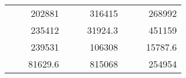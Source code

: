 \begin{table}[H]
\begin{tabular}{|ccrccrccc}
\rowcolor[HTML]{DAE8FC} 
\multicolumn{1}{|c|}{\cellcolor[HTML]{FFFFC7}}                                & \multicolumn{1}{c|}{\cellcolor[HTML]{DAE8FC}}                      & \multicolumn{1}{r|}{\cellcolor[HTML]{DAE8FC}202881}    & \multicolumn{1}{c|}{\cellcolor[HTML]{FFFFC7}}                                & \multicolumn{1}{c|}{\cellcolor[HTML]{DAE8FC}}                       & \multicolumn{1}{r|}{\cellcolor[HTML]{DAE8FC}316415}    & \multicolumn{1}{c|}{\cellcolor[HTML]{FFFFC7}}                                & \multicolumn{1}{c|}{\cellcolor[HTML]{DAE8FC}}                      & \multicolumn{1}{r|}{\cellcolor[HTML]{DAE8FC}268992}    \\ \cline{3-3} \cline{6-6} \cline{9-9} 
\multicolumn{1}{|c|}{\cellcolor[HTML]{FFFFC7}}                                & \multicolumn{1}{c|}{\cellcolor[HTML]{DAE8FC}}                      & \multicolumn{1}{r|}{\cellcolor[HTML]{DDFDFF}235412}    & \multicolumn{1}{c|}{\cellcolor[HTML]{FFFFC7}}                                & \multicolumn{1}{c|}{\cellcolor[HTML]{DAE8FC}}                       & \multicolumn{1}{r|}{\cellcolor[HTML]{DDFDFF}31924.3}   & \multicolumn{1}{c|}{\cellcolor[HTML]{FFFFC7}}                                & \multicolumn{1}{c|}{\cellcolor[HTML]{DAE8FC}}                      & \multicolumn{1}{r|}{\cellcolor[HTML]{DDFDFF}451159}    \\ \cline{3-3} \cline{6-6} \cline{9-9} 
\rowcolor[HTML]{DAE8FC} 
\multicolumn{1}{|c|}{\cellcolor[HTML]{FFFFC7}}                                & \multicolumn{1}{c|}{\cellcolor[HTML]{DAE8FC}}                      & \multicolumn{1}{r|}{\cellcolor[HTML]{DAE8FC}239531}    & \multicolumn{1}{c|}{\cellcolor[HTML]{FFFFC7}}                                & \multicolumn{1}{c|}{\cellcolor[HTML]{DAE8FC}}                       & \multicolumn{1}{r|}{\cellcolor[HTML]{DAE8FC}106308}    & \multicolumn{1}{c|}{\cellcolor[HTML]{FFFFC7}}                                & \multicolumn{1}{c|}{\cellcolor[HTML]{DAE8FC}}                      & \multicolumn{1}{r|}{\cellcolor[HTML]{DAE8FC}15787.6}   \\ \cline{3-3} \cline{6-6} \cline{9-9} 
\multicolumn{1}{|c|}{\cellcolor[HTML]{FFFFC7}}                                & \multicolumn{1}{c|}{\cellcolor[HTML]{DAE8FC}}                      & \multicolumn{1}{r|}{\cellcolor[HTML]{DDFDFF}81629.6}   & \multicolumn{1}{c|}{\cellcolor[HTML]{FFFFC7}}                                & \multicolumn{1}{c|}{\cellcolor[HTML]{DAE8FC}}                       & \multicolumn{1}{r|}{\cellcolor[HTML]{DDFDFF}815068}    & \multicolumn{1}{c|}{\cellcolor[HTML]{FFFFC7}}                                & \multicolumn{1}{c|}{\cellcolor[HTML]{DAE8FC}}                      & \multicolumn{1}{r|}{\cellcolor[HTML]{DDFDFF}254954}    \\ \cline{3-3} \cline{6-6} \cline{9-9} 

\end{tabular}
\end{table}
